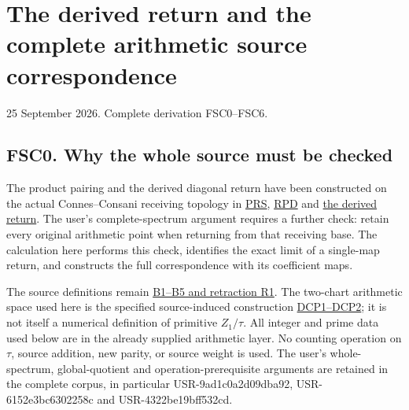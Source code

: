 \chapter{The derived return and the complete arithmetic source
correspondence}\label{the-derived-return-and-the-complete-arithmetic-source-correspondence}

25 September 2026. Complete derivation FSC0--FSC6.

\section{FSC0. Why the whole source must be
checked}\label{fsc0.-why-the-whole-source-must-be-checked}

The product pairing and the derived diagonal return have been
constructed on the actual Connes--Consani receiving topology in
\href{https://github.com/KokunoYumeto/zeta-function-research-reader/blob/main/workbenches/splitzero-tandem/continuations/20260925-full-source-tensor-and-original-divisor/counterfactual/ORIGINAL_RESIDUE_PRODUCT_SHEAF_PAIRING.md}{PRS},
\href{https://github.com/KokunoYumeto/zeta-function-research-reader/blob/main/workbenches/splitzero-tandem/continuations/20260925-full-source-tensor-and-original-divisor/counterfactual/RESIDUE_PRODUCT_DIAGONAL_INDEPENDENT.md}{RPD}
and
\href{https://github.com/KokunoYumeto/zeta-function-research-reader/blob/main/workbenches/splitzero-tandem/continuations/20260925-full-source-tensor-and-original-divisor/counterfactual/DIAGONAL_EXTRAORDINARY_RETURN.md}{the
derived return}. The user's complete-spectrum argument requires a
further check: retain every original arithmetic point when returning
from that receiving base. The calculation here performs this check,
identifies the exact limit of a single-map return, and constructs the
full correspondence with its coefficient maps.

The source definitions remain
\href{https://github.com/KokunoYumeto/zeta-function-research-reader/blob/36a82ecca98addb8a98b48204e349737856c7223/workbenches/splitzero-tandem/continuations/20260924-cohomology-weight-and-character-lifts/original-character-lifting/foundations/user_definitions_20260924/SOURCE_OPERATIONS_AND_PROOFS.md}{B1--B5
and retraction R1}. The two-chart arithmetic space used here is the
specified source-induced construction
\href{https://github.com/KokunoYumeto/zeta-function-research-reader/blob/36a82ecca98addb8a98b48204e349737856c7223/workbenches/splitzero-tandem/continuations/20260924-cohomology-weight-and-character-lifts/original-character-lifting/tau_lifting_weights_20260924/SOURCE_CC_DOUBLE_PULLBACK.md}{DCP1--DCP2};
it is not itself a numerical definition of primitive \(Z_1/\tau\). All
integer and prime data used below are in the already supplied arithmetic
layer. No counting operation on \(\tau\), source addition, new parity,
or source weight is used. The user's whole-spectrum, global-quotient and
operation-prerequisite arguments are retained in the complete corpus, in
particular USR-9ad1c0a2d09dba92, USR-6152e3bc6302258c and
USR-4322be19bff532cd.


